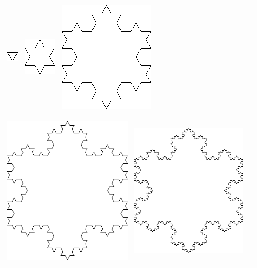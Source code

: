 \documentclass[10pt,fleqn]{article} %
\begin{document}
\begin{multicols}{2}
\begin{center}
\begin{tabular}{ccc}
\includegraphics[width=.25\linewidth]{images/exo_FB_10_K1} &
\includegraphics[width=.25\linewidth]{images/exo_FB_10_K2} & 
\includegraphics[width=.25\linewidth]{images/exo_FB_10_K3} \\
\end{tabular}
\begin{tabular}{ccc}
\includegraphics[width=.4\linewidth]{images/exo_FB_10_K4} & 
\includegraphics[width=.4\linewidth]{images/exo_FB_10_K5}
\end{tabular}
\end{center}


\end{multicols}
\end{document}
